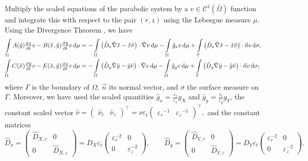 \documentclass[11pt]{article}
\numberwithin{equation}{section}
\begin{document}
Multiply the scaled equations of the parabolic system by a $v \in \mathcal{C}^1 (\bar\Omega)$ function and integrate this with respect to the pair \((r,z)\) using the Lebesgue measure \(\mu\). Using the Divergence Theorem \cite{Evans-2010}, we have
\begin{equation}
\label{eq:var-time-base}
\begin{aligned}
    \int\limits_\Omega
    A(\hat y) \pd{\hat{x}}{\hat{t}} v 
    -
    B(\hat x, \hat y) \pd{\hat y}{\hat t} v
    \dif\mu
    &=
    -\int\limits_\Omega 
    \big( \hat{D}_x \hat{\nabla} \hat{x} - \hat{x}\hat{\nu}\big) \cdot \hat{\nabla} v \dif\mu
    -\int\limits_\Omega \hat{g}_x v \dif\mu
    +\int\limits_{\Gamma}    \big( \hat{D}_x \hat{\nabla} \hat{x} - \hat{x}\hat{\nu}\big) \cdot \vec{n}  v    \dif \sigma,
    \\
    \int\limits_\Omega
    C(\hat{x})  \pd{\hat{y}}{\hat{t}} v 
    -
    E(\hat{x},\hat{y})  \pd{\hat x}{\hat t} v
    \dif\mu
    &=
    -\int\limits_\Omega 
    \big(\hat{D}_y \hat{\nabla} \hat{y} - \hat{y}\hat{\nu} \big) \cdot \hat{\nabla} v \dif\mu
    -\int\limits_\Omega \hat{g}_y v \dif\mu
    +\int\limits_{\Gamma}  \big(\hat{D}_y \hat{\nabla} \hat{y} - \hat{y}\hat{\nu} \big) \cdot \vec{n} v    \dif \sigma;
\end{aligned}
\end{equation}
where $\Gamma$ is the boundary of $\Omega$, $\vec{n}$ its normal vector, and $\sigma$ the surface measure on $\Gamma$. Moreover, we have used the scaled quantities \(\hat{g}_x = \frac{\varepsilon_t}{\varepsilon_x} g_X \) and \( \hat{g}_y = \frac{\varepsilon_t}{\varepsilon_y} {g}_Y \), the constant scaled vector 
\(
    \hat{\nu} = (
    \begin{smallmatrix}
        \hat{\nu}_r
        &
        \hat{\nu}_z
    \end{smallmatrix})^\top
    =
    \nu \varepsilon_t (
    \begin{smallmatrix}
        {\varepsilon_r}^{-1}
        &
        {\varepsilon_z}^{-1}
    \end{smallmatrix})^\top,
\) 
and the constant matrices
\[
    \hat{D}_x = 
    \begin{pmatrix}
         \hat{D}_{X,r} & 0 
         \\
        0 &  \hat{D}_{X,z}
    \end{pmatrix}
    =
    D_X \varepsilon_t
    \begin{pmatrix}
         \varepsilon_r^{-2} & 0 
         \\
        0 &  \varepsilon_z^{-2}
    \end{pmatrix}
    ,\qquad
    \hat{D}_y = 
    \begin{pmatrix}
         \hat{D}_{Y,r} & 0 
         \\
        0 &  \hat{D}_{Y,z}
    \end{pmatrix}
    =
    D_Y \varepsilon_t
    \begin{pmatrix}
         \varepsilon_r^{-2} & 0 
         \\
        0 &  \varepsilon_z^{-2}
    \end{pmatrix}.
\]
\end{document}
